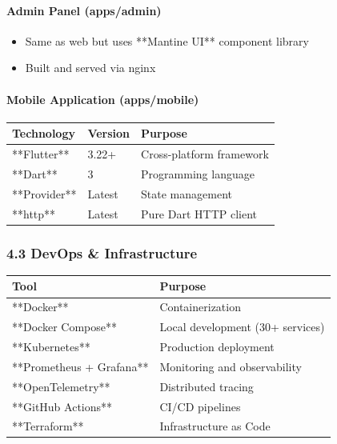 \documentclass[11pt,a4paper]{article}
\begin{document}
\paragraph{Admin Panel (apps/admin)}

\begin{itemize}
\item Same as web but uses **Mantine UI** component library
\item Built and served via nginx
\end{itemize}

\paragraph{Mobile Application (apps/mobile)}

\begin{table}[H]
\centering
\begin{tabular}{|l|l|l|}
\hline
Technology & Version & Purpose \\
\hline
**Flutter** & 3.22+ & Cross-platform framework \\
\hline
**Dart** & 3 & Programming language \\
\hline
**Provider** & Latest & State management \\
\hline
**http** & Latest & Pure Dart HTTP client \\
\hline
\end{tabular}
\end{table}

\subsubsection{4.3 DevOps & Infrastructure}

\begin{table}[H]
\centering
\begin{tabular}{|l|l|}
\hline
Tool & Purpose \\
\hline
**Docker** & Containerization \\
\hline
**Docker Compose** & Local development (30+ services) \\
\hline
**Kubernetes** & Production deployment \\
\hline
**Prometheus + Grafana** & Monitoring and observability \\
\hline
**OpenTelemetry** & Distributed tracing \\
\hline
**GitHub Actions** & CI/CD pipelines \\
\hline
**Terraform** & Infrastructure as Code \\
\hline
\end{tabular}
\end{table}
\end{document}
